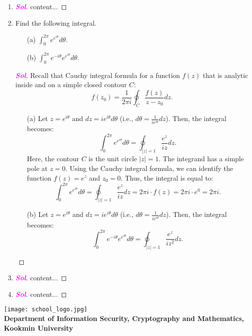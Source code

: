 \documentclass{article}
\newcommand{\footer}[1]{
\begin{flushright}
	\vspace{2em}
	\texttt{[image: school\_logo.jpg]} \\
	\vspace{1em}
	\textcolor{blue2}{\small\textbf{#1}}
\end{flushright}
}
\newcommand{\ie}{\textnormal{i.e.}}
\theoremstyle{definition}
\newcommand{\of}[1]{\left( #1 \right)}
\newcommand{\abs}[1]{\left\lvert #1 \right\rvert}
\newcommand{\sol}{\textcolor{magenta}{\bf Sol}}
\begin{document}
\begin{enumerate}
\begin{itemize}
	\end{itemize}
	\begin{proof}[\sol]
		\begin{itemize}
			\item[(a)] Let $f\of{z}=e^z$ then \[
			\int_C\frac{e^z}{z}dz=\int_C\frac{f\of{z}}{z-0}dz=f\of{0}2\pi i=2\pi i.
			\]
			\item[(b)] Let $f\of{z}=z^2$ then \[
			\int_C\frac{z^2}{z-1}dz=\int_C\frac{f\of{z}}{z-1}dz=f\of{1}2\pi i=2\pi i.
			\]
			\item[(c)] $\displaystyle\int_C\frac{z}{z-3}dz$
			\item[(d)] $\displaystyle\int_C\frac{\cos z}{z\of{z^2+9}}dz$
		\end{itemize}
	\end{proof}
	\item 
	\begin{proof}[\sol]
		content...
	\end{proof}
	\item Find the following integral. \begin{itemize}
		\item[(a)] $\displaystyle\int_0^{2\pi}e^{e^{i\theta}}d\theta$.
		\item[(b)] $\displaystyle\int_0^{2\pi}e^{-i\theta}e^{e^{i\theta}}d\theta$.
	\end{itemize}
	\begin{proof}[\sol]
		Recall that Cauchy integral formula for a function $f\of{z}$ that is analytic inside and on a simple closed contour $C$: \[
		f\of{z_0}=\frac{1}{2\pi i}\oint_C\frac{f\of{z}}{z-z_0}dz.
		\]
		\vspace{4pt}
		\begin{itemize}
			\item[(a)] Let $z = e^{i\theta}$ and $dz = ie^{i\theta} d\theta$ (\ie, $d\theta=\frac{1}{ie^{i\theta}}dz$). Then, the integral becomes: \[
			\int_0^{2\pi}e^{e^{i\theta}}d\theta=\oint_{\abs{z}=1}\frac{e^z}{iz}dz.
			\] Here, the contour $C$ is the unit circle $|z|=1$. The integrand has a simple pole at $z=0$. Using the Cauchy integral formula, we can identify the function $f(z) = e^z$ and $z_0=0$. Thus, the integral is equal to:
			\[
			\int_0^{2\pi}e^{e^{i\theta}}d\theta = \oint_{\abs{z}=1}\frac{e^z}{iz}dz = 2\pi i\cdot f\of{z}=2\pi i\cdot e^0 = 2\pi i.
			\]
			\vspace{4pt}
			\item[(b)] Let $z = e^{i\theta}$ and $dz = ie^{i\theta} d\theta$ (\ie, $d\theta=\frac{1}{ie^{i\theta}}dz$). Then, the integral becomes: \[
			\int_0^{2\pi}e^{-i\theta}e^{e^{i\theta}}d\theta=\oint_{\abs{z}=1}\frac{e^z}{iz^2}dz.
			\] 
		\end{itemize}
	\end{proof}
	\item 
	\begin{proof}[\sol]
		content...
	\end{proof}
	\item 
	\begin{proof}[\sol]
		content...
	\end{proof}
\end{enumerate}

\footer{Department of Information Security, Cryptography and Mathematics, Kookmin University}
\end{document}
